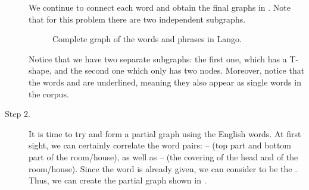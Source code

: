 \begin{refsection}
\begin{mysolution}
\begin{description}
We continue to connect each word and obtain the final graphs in . Note that for this problem there are two independent subgraphs.


\begin{figure}
  \caption{Complete graph of the words and phrases in Lango.}
  \label{fig:Lango-step2}
  \baselineskip
\end{figure}


 Notice that we have two separate subgraphs: the first one, which has a T-shape, and the second one which only has two nodes. Moreover, notice that the words  and  are underlined, meaning they also appear as single words in the corpus.

\item[Step 2.] It is time to try and form a partial graph using the English words. At first sight, we can certainly correlate the word pairs:  --  (top part and bottom part of the room/house), as well as  --  (the covering of the head and of the room/house). Since the word  is already given, we can consider  to be the . Thus, we can create the partial graph shown in .


\end{description}
\end{mysolution}
\end{refsection}
